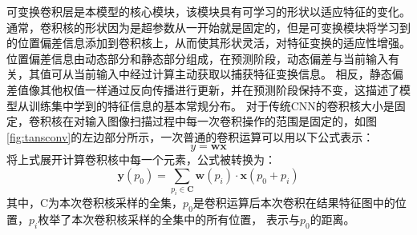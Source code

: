可变换卷积层是本模型的核心模块，该模块具有可学习的形状以适应特征的变化。 
通常，卷积核的形状因为是超参数从一开始就是固定的，但是可变换模块将学习到的位置偏差信息添加到卷积核上，从而使其形状灵活，对特征变换的适应性增强。 
位置偏差信息由动态部分和静态部分组成，在预测阶段，动态偏差与当前输入有关，其值可从当前输入中经过计算主动获取以捕获特征变换信息。 
相反，静态偏差值像其他权值一样通过反向传播进行更新，并在预测阶段保持不变，这描述了模型从训练集中学到的特征信息的基本常规分布。
对于传统CNN的卷积核大小是固定，卷积核在对输入图像扫描过程中每一次卷积操作的范围是固定的，如图\ref{fig:tansconv}的左边部分所示，一次普通的卷积运算可以用以下公式表示：
\begin{equation}
  y=\mathbf{w}\mathbf{x}
  \end{equation}
  将上式展开计算卷积核中每一个元素，公式被转换为：
  \begin{equation}
    \mathbf{y}\left(p_{0}\right)=\sum_{p_{i} \in \mathbf{C}} \mathbf{w}\left(p_{i}\right) \cdot \mathbf{x}\left(p_{0}+p_{i}\right)
    \end{equation}
其中，C为本次卷积核采样的全集，$p_{0}$是卷积运算后本次卷积在结果特征图中的位置，$p_{i}$枚举了本次卷积核采样的全集中的所有位置，
表示与$p_{0}$的距离。

